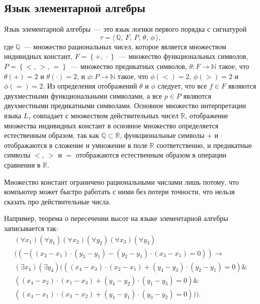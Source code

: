\subsection{Язык элементарной алгебры}

Язык элементарной алгебры~--- это язык логики первого порядка с сигнатурой
\begin{equation*}
    \tau = \langle \, \mathbb{Q},\, F,\, P,\, \theta,\, \phi \, \rangle,
\end{equation*}
где $\mathbb{Q}$~--- множество рациональных чисел, которое является множеством индивидных констант, $F =  \left\{+,\, \cdot\right\}$~--- множество функциональных символов, $P = \left\{ <,\, >,\, = \right\}$~--- множество предикатных символов, $\theta : F \rightarrow \mathbb{N}$ такое, что $\theta(+) = 2$ и $\theta(\cdot) = 2$, и $\phi : P \rightarrow \mathbb{N}$ такое, что $\phi(<) = 2$, $\phi(>) = 2$ и $\phi(=) = 2$. Из определения отображений $\theta$ и $\phi$ следует, что все $f \in F$ являются двухместными функциональными символами, а все $p \in P$ являются двухместными предикатными символами. Основное множество интерпретации языка $L_\tau $ совпадает с множеством действительных чисел $\mathbb{R}$, отображение множества индивидных констант в основное множество определяется естественным образом, так как $\mathbb{Q} \subset \mathbb{R}$, функциональные символы $+$ и $\cdot$ отображаются в сложение и умножение в поле $\mathbb{R}$ соответственно, и предикатные символы $<$, $>$ и $=$ отображаются естественным образом в операции сравнения в $\mathbb{R}$.

\begin{remark}
    Множество констант ограничено рациональными числами лишь потому, что компьютер может быстро работать с ними без потери точности, что нельзя сказать про действительные числа.
\end{remark}

Например, теорема о пересечении высот на языке элементарной алгебры записывается так:
\begin{gather*}
    (\forall x_1)(\forall y_1)(\forall x_2)(\forall y_2)(\forall x_3)(\forall y_3) \\
    (
        (
            \lnot
            (
                (x_2 - x_1)\cdot(y_3 - y_1) - (y_2 - y_1)\cdot(x_3 - x_1) = 0
            )
        )
        \to \\
        (\exists x_4)(\exists y_4)
        (
           (
                (x_4 - x_3)\cdot(x_2 - x_1) + (y_4 - y_3)\cdot(y_2 - y_1) = 0
            ) \& \\
            (
                (x_4 - x_2)\cdot(x_1 - x_3) + (y_4 - y_2)\cdot(y_1 - y_3) = 0
            ) \& \\
            (
                (x_4 - x_1)\cdot(x_3 - x_2) + (y_4 - y_1)\cdot(y_3 - y_2) = 0
            )
        )
    ).
\end{gather*}

